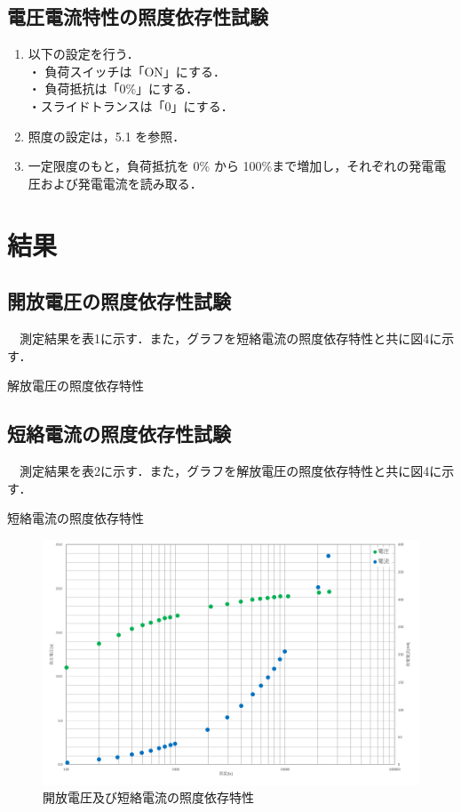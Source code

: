\subsection{電圧電流特性の照度依存性試験}
\begin{enumerate}
  \item 以下の設定を行う．\\
  ・ 負荷スイッチは「ON」にする．\\
  ・ 負荷抵抗は「0\%」にする．\\
  ・スライドトランスは「0」にする．
  \item 照度の設定は，5.1 を参照．
  \item 一定限度のもと，負荷抵抗を 0\% から 100\%まで増加し，それぞれの発電電圧および発電電流を読み取る．
\end{enumerate}

\newpage
\section{結果}
\subsection{開放電圧の照度依存性試験}
　測定結果を表1に示す．また，グラフを短絡電流の照度依存特性と共に図4に示す．\\

\begin{table}[H]
  \small
  \centering
  \caption{解放電圧の照度依存特性}
  
\end{table}

\newpage
\subsection{短絡電流の照度依存性試験}
　測定結果を表2に示す．また，グラフを解放電圧の照度依存特性と共に図4に示す．\\
\begin{table}[H]
  \small
  \centering
  \small
  \caption{短絡電流の照度依存特性}
  
\end{table}

\begin{figure}[H]
  \centering
  \includegraphics[width=14.3cm]{./fig/fig04.png}
  \caption{開放電圧及び短絡電流の照度依存特性}
\end{figure}

